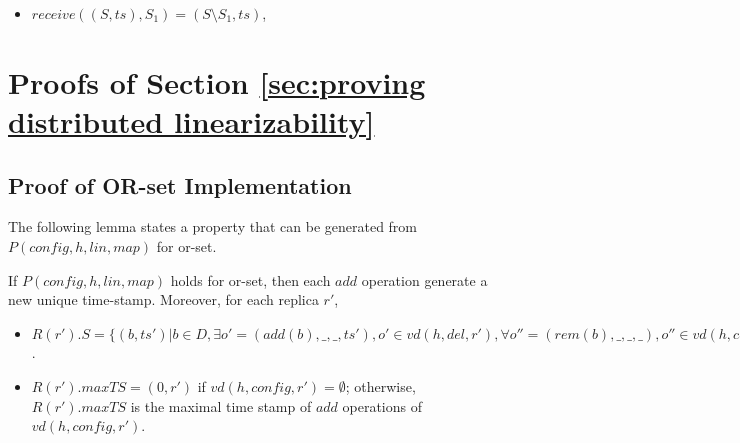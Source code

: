 {\begin{itemize}
\item[-] $\mathit{receive}((S,\mathit{ts}),S_1) = (S \setminus S_1,\mathit{ts})$,
\end{itemize}






\section{\Spec{}}
\label{sec:specification}


















\section{Proofs of Section \ref{sec:proving distributed linearizability}}
\label{sec:appendix proofs of section proving distributed linearizability}





\subsection{Proof of OR-set Implementation}
\label{subsec:appendix proofs of or-set implementation}

The following lemma states a property that can be generated from $P(\mathit{config},h,\mathit{lin},\mathit{map})$ for or-set.

\begin{lemma}
\label{lemma:a property that can be obtained from P for or-set}
If $P(\mathit{config},h,\mathit{lin},\mathit{map})$ holds for or-set, then each $\mathit{add}$ operation generate a new unique time-stamp. Moreover, for each replica $r'$,

\begin{itemize}
    \setlength{\itemsep}{0.5pt}
    \item[-] $R(r').S = \{ (b,\mathit{ts}') \vert b \in D, \exists o' = (\mathit{add}(b),\_,\_,\mathit{ts}'), o' \in \mathit{vd}(h,\mathit{del},r'), \forall o'' = (\mathit{rem}(b),\_,\_,\_), o'' \in \mathit{vd}(h,\mathit{config},r') \Rightarrow (o',o'') \notin h.\mathit{vis} \}$.

    \item[-] $R(r').\mathit{maxTS} = (0,r')$ if $\mathit{vd}(h,\mathit{config},r') = \emptyset$; otherwise, $R(r').\mathit{maxTS}$ is the maximal time stamp of $\mathit{add}$ operations of $\mathit{vd}(h,\mathit{config},r')$.
    \end{itemize}
\end{lemma}

}
